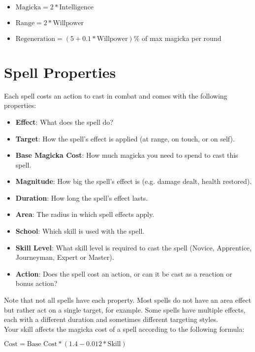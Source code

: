 \begin{itemize}
	\item $\text{Magicka}=2*\text{Intelligence}$
	\item $\text{Range}=2*\text{Willpower}$
	\item $\text{Regeneration}=(5+0.1*\text{Willpower})\%$ of max magicka per round
\end{itemize}

\section{Spell Properties}
Each spell costs an action to cast in combat and comes with the following properties:

\begin{itemize}
	\item \textbf{Effect}: What does the spell do?
	\item \textbf{Target}: How the spell's effect is applied (at range, on touch, or on self).
	\item \textbf{Base Magicka Cost}: How much magicka you need to spend to cast this spell.
	\item \textbf{Magnitude}: How big the spell's effect is (e.g. damage dealt, health restored).
	\item \textbf{Duration}: How long the spell's effect lasts.
	\item \textbf{Area}: The radius in which spell effects apply.
	\item \textbf{School}: Which skill is used with the spell.
	\item \textbf{Skill Level}: What skill level is required to cast the spell (Novice, Apprentice, Journeyman, Expert or Master).
	\item \textbf{Action}: Does the spell cost an action, or can it be cast as a reaction or bonus action?
\end{itemize}

Note that not all spells have each property. Most spells do not have an area effect but rather act on a single target, for example. Some spells have multiple effects, each with a different duration and sometimes different targeting styles.\\

Your skill affects the magicka cost of a spell according to the following formula:

\begin{center}
$\text{Cost}=\text{Base Cost}*(1.4-0.012*\text{Skill})$
\end{center}


